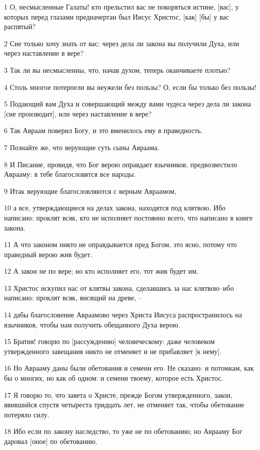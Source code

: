 \par 1 О, несмысленные Галаты! кто прельстил вас не покоряться истине, [вас], у которых перед глазами предначертан был Иисус Христос, [как] [бы] у вас распятый?
\par 2 Сие только хочу знать от вас: через дела ли закона вы получили Духа, или через наставление в вере?
\par 3 Так ли вы несмысленны, что, начав духом, теперь оканчиваете плотью?
\par 4 Столь многое потерпели вы неужели без пользы? О, если бы только без пользы!
\par 5 Подающий вам Духа и совершающий между вами чудеса через дела ли закона [сие производит], или через наставление в вере?
\par 6 Так Авраам поверил Богу, и это вменилось ему в праведность.
\par 7 Познайте же, что верующие суть сыны Авраама.
\par 8 И Писание, провидя, что Бог верою оправдает язычников, предвозвестило Аврааму: в тебе благословятся все народы.
\par 9 Итак верующие благословляются с верным Авраамом,
\par 10 а все, утверждающиеся на делах закона, находятся под клятвою. Ибо написано: проклят всяк, кто не исполняет постоянно всего, что написано в книге закона.
\par 11 А что законом никто не оправдывается пред Богом, это ясно, потому что праведный верою жив будет.
\par 12 А закон не по вере; но кто исполняет его, тот жив будет им.
\par 13 Христос искупил нас от клятвы закона, сделавшись за нас клятвою--ибо написано: проклят всяк, висящий на древе, --
\par 14 дабы благословение Авраамово через Христа Иисуса распространилось на язычников, чтобы нам получить обещанного Духа верою.
\par 15 Братия! говорю по [рассуждению] человеческому: даже человеком утвержденного завещания никто не отменяет и не прибавляет [к нему].
\par 16 Но Аврааму даны были обетования и семени его. Не сказано: и потомкам, как бы о многих, но как об одном: и семени твоему, которое есть Христос.
\par 17 Я говорю то, что завета о Христе, прежде Богом утвержденного, закон, явившийся спустя четыреста тридцать лет, не отменяет так, чтобы обетование потеряло силу.
\par 18 Ибо если по закону наследство, то уже не по обетованию; но Аврааму Бог даровал [оное] по обетованию.
